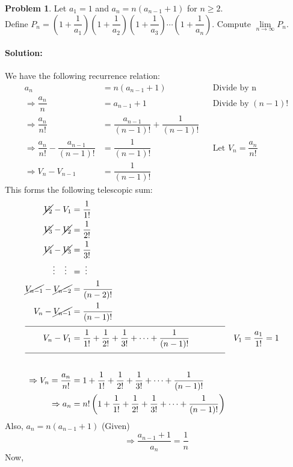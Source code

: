 \documentclass[14]{article}
\theoremstyle{definition}
\newtheorem{prob}{Problem}
\theoremstyle{case}
\begin{document}
\pagebreak
\begin{prob}
Let $a_1 = 1$ and $a_n = n (a_{n-1} + 1)$ for $n \geq 2$.\\ Define $P_n = \left(1 + \dfrac1{a_1}\right)\left(1 + \dfrac1{a_2}\right)\left(1 + \dfrac1{a_3}\right)\cdots\left(1 + \dfrac1{a_n}\right)$. Compute $\lim\limits_{n \to \infty} P_n$.
\paragraph{Solution:}
We have the following recurrence relation:
\begin{align*}
a_n &= n(a_{n-1} + 1) && \text{Divide by n}\\
\Rightarrow\dfrac{a_n}{n} &= a_{n-1} + 1 && \text{Divide by } (n-1)!\\
\Rightarrow \dfrac{a_n}{n!} &= \dfrac{a_{n-1}}{(n-1)!} + \dfrac{1}{(n-1)!}\\
\Rightarrow \dfrac{a_n}{n!} - \dfrac{a_{n-1}}{(n-1)!} &= \dfrac{1}{(n-1)!} && \text{Let } V_n = \dfrac{a_n}{n!}\\
\Rightarrow V_n - V_{n-1} &= \dfrac{1}{(n-1)!}
\end{align*}
This forms the following telescopic sum:
\begin{align*}
\cancel{V_2} - V_1 &= \dfrac1{1!}\\
\cancel{V_3} - \cancel{V_2} &= \dfrac1{2!}\\
\cancel{V_4} - \cancel{V_3} &= \dfrac1{3!}\\
\vdots\;\;\;\;\vdots\;\;&= \; \vdots\\
\cancel{V_{n-1}} - \cancel{V_{n-2}} &= \dfrac1{(n-2)!}\\
V_n - \cancel{V_{n-1}} &= \dfrac1{(n-1)!}\\
\cline{1-2}
V_n - V_1 &= \dfrac1{1!} + \dfrac1{2!} + \dfrac1{3!} + \cdots + \dfrac1{(n-1)!}&& V_1 = \dfrac{a_1}{1!} = 1\\
\cline{1-2}\\
\Rightarrow V_n = \dfrac{a_n}{n!} &= 1 + \dfrac1{1!} + \dfrac1{2!} + \dfrac1{3!} + \cdots + \dfrac1{(n-1)!}\\
\Rightarrow a_n &= n! \left( 1 + \dfrac1{1!} + \dfrac1{2!} + \dfrac1{3!} + \cdots + \dfrac1{(n-1)!} \right)\\
\end{align*}
Also, $a_n = n(a_{n-1} + 1)$ (Given)
\begin{equation}
\Rightarrow \dfrac{a_{n-1} + 1}{a_n} = \dfrac1n \label{p17e1}
\end{equation}
Now,
\begin{align*}

\end{align*}
\end{prob}
\end{document}
